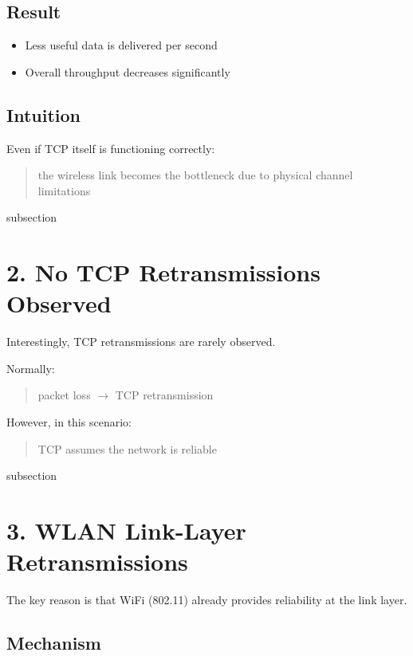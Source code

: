 \subsection*{Result}

\begin{itemize}
    \item Less useful data is delivered per second
    \item Overall throughput decreases significantly
\end{itemize}

\subsection*{Intuition}

Even if TCP itself is functioning correctly:

\begin{quote}
the wireless link becomes the bottleneck due to physical channel limitations
\end{quote}

subsection

\section{2. No TCP Retransmissions Observed}

Interestingly, TCP retransmissions are rarely observed.

Normally:

\begin{quote}
packet loss $\rightarrow$ TCP retransmission
\end{quote}

However, in this scenario:

\begin{quote}
TCP assumes the network is reliable
\end{quote}

subsection

\section{3. WLAN Link-Layer Retransmissions}

The key reason is that WiFi (802.11) already provides reliability at the link layer.

\subsection*{Mechanism}

